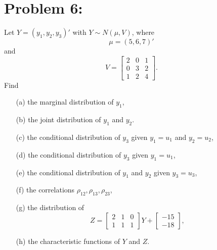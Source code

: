 \documentclass[11pt]{article}
\begin{document}
\section*{Problem 6:}
Let $Y = (y_1,y_2,y_3)'$ with $Y\sim N(\mu,V)$, where
\[
\mu = (5,6,7)'
\]
and
\[
V = \begin{bmatrix}
2 & 0 & 1 \\
0 & 3 & 2 \\
1 & 2 & 4
\end{bmatrix}.
\]
Find
\begin{itemize}
\item[(a)] the marginal distribution of $y_1$,
\item[(b)] the joint distribution of $y_1$ and $y_2$.
\item[(c)] the conditional distribution of $y_3$ given $y_1 = u_1$ and $y_2 = u_2$,
\item[(d)] the conditional distribution of $y_3$ given $y_1= u_1$,
\item[(e)] the conditional distribution of $y_1$ and $y_2$ given $y_3 = u_3$,
\item[(f)] the correlations $\rho_{12},\rho_{13},\rho_{23}$,
\item[(g)] the distribution of
\[
Z = \begin{bmatrix}
2 & 1 & 0 \\
1 & 1 & 1
\end{bmatrix}Y + \begin{bmatrix}
-15 \\ -18
\end{bmatrix},
\]
\item[(h)] the characteristic functions of $Y$ and $Z$.
\end{itemize}
\end{document}
